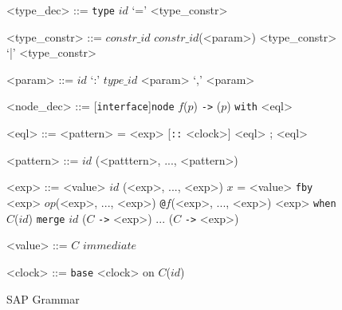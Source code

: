 \begin{figure}
\begin{grammar}

<type_dec> ::= \verb|type| $id$ `=' <type_constr>

<type_constr> ::= $constr\_id$
\alt $constr\_id$(<param>)
\alt <type_constr> `|' <type_constr>

<param> ::= $id$ `:' $type\_id$
\alt <param> `,' <param>

<node_dec> ::= [\verb|interface|]\verb|node| $f$($p$) \verb|->| ($p$) \verb|with| <eql>

<eql> ::= <pattern> = <exp> [\verb|::| <clock>]
\alt <eql> ; <eql>

<pattern> ::= $id$
\alt (<patttern>, ..., <pattern>)

<exp> ::= <value>
\alt $id$
\alt (<exp>, ..., <exp>)
\alt $x$ = <value> \verb|fby| <exp>
\alt $op$(<exp>, ..., <exp>)
\alt \verb|@|$f$(<exp>, ..., <exp>)
\alt <exp> \verb|when| $C$($id$)
\verb|merge| $id$ ($C$ \verb|->| <exp>) ... ($C$ \verb|->| <exp>)

<value> ::= $C$ \alt $immediate$

<clock> ::= \verb|base|
\alt <clock> on $C$($id$)

\end{grammar}
\hrulefill
\caption{SAP Grammar}
\label{SapGrammar}
\end{figure}